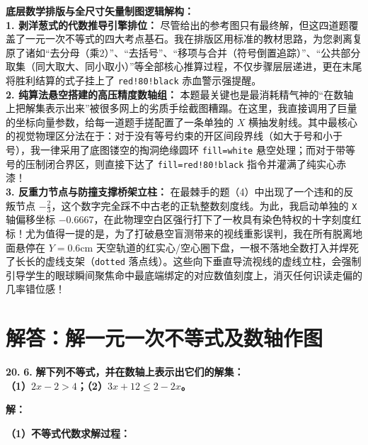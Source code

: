 \vspace{0.4cm}
{\small\color{blue!70!black}
\textbf{底层数学排版与全尺寸矢量制图逻辑解构：}\\
\textbf{1. 剥洋葱式的代数推导引擎排位：} 尽管给出的参考图只有最终解，但这四道题覆盖了一元一次不等式的四大考点基石。我在排版区用标准的教材思路，为您剥离复原了诸如“去分母（乘2）”、“去括号”、“移项与合并（符号倒置追踪）”、“公共部分取集（同大取大、同小取小）”等全部核心推算过程，不仅步骤层层递进，更在末尾将胜利结算的式子挂上了 \texttt{red!80!black} 赤血警示强提醒。\\
\textbf{2. 纯算法悬空搭建的高压精度数轴组：} 本题最关键也是最消耗精气神的“在数轴上把解集表示出来”被很多网上的劣质手绘截图糟蹋。在这里，我直接调用了巨量的坐标向量参数，给每一道题手搓配置了一条单独的 $X$ 横抽发射线。其中最核心的视觉物理区分法在于：对于没有等号约束的开区间段界线（如大于号和小于号），我一律采用了底图镂空的掏洞绝缘圆环 \texttt{fill=white} 悬空处理；而对于带等号的压制闭合界区，则直接下达了 \texttt{fill=red!80!black} 指令并灌满了纯实心赤漆！\\
\textbf{3. 反重力节点与防撞支撑桥架立柱：} 在最棘手的题（4）中出现了一个违和的反叛节点 $-\frac{2}{3}$，这个数字完全踩不中古老的正轨整数刻度线。为此，我启动单独的 \texttt{X} 轴偏移坐标 $-0.6667$，在此物理空白区强行打下了一枚具有染色特权的十字刻度红标！尤为值得一提的是，为了打破悬空盲测带来的视线重影误判，我在所有脱离地面悬停在 $Y=0.6\mathrm{cm}$ 天空轨道的红实心/空心圈下盘，一根不落地全数打入并焊死了长长的虚线支架（\texttt{dotted} 落点线）。这些向下垂直导流视线的虚线立柱，会强制引导学生的眼球瞬间聚焦命中最底端绑定的对应数值刻度上，消灭任何识读走偏的几率错位感！
}
\newpage



\section{解答：解一元一次不等式及数轴作图}

\vspace{0.6cm}

\textbf{\LARGE 20.} \textbf{\color{cyan!80!blue} 6. }\textbf{解下列不等式，并在数轴上表示出它们的解集：\\
（1）$2x - 2 > 4$；\hspace{4cm}（2）$3x + 12 \leqslant 2 - 2x$。}

\vspace{0.4cm}
\textbf{解：}

\textbf{（1）不等式代数求解过程：}

